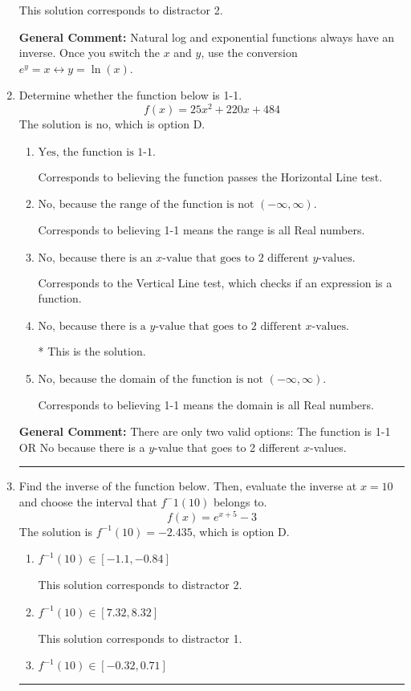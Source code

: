 \documentclass{extbook}[14pt]
\newcommand{\litem}[1]{\item #1

\rule{\textwidth}{0.4pt}}
\begin{document}
\begin{enumerate}
{\begin{enumerate}[label=\Alph*.]
 This solution corresponds to distractor 2.
\end{enumerate}

\textbf{General Comment:} Natural log and exponential functions always have an inverse. Once you switch the $x$ and $y$, use the conversion $ e^y = x \leftrightarrow y=\ln(x)$.
}
\litem{
Determine whether the function below is 1-1.
\[ f(x) = 25 x^2 + 220 x + 484 \]The solution is \( \text{no} \), which is option D.\begin{enumerate}[label=\Alph*.]
\item \( \text{Yes, the function is 1-1.} \)

Corresponds to believing the function passes the Horizontal Line test.
\item \( \text{No, because the range of the function is not $(-\infty, \infty)$.} \)

Corresponds to believing 1-1 means the range is all Real numbers.
\item \( \text{No, because there is an $x$-value that goes to 2 different $y$-values.} \)

Corresponds to the Vertical Line test, which checks if an expression is a function.
\item \( \text{No, because there is a $y$-value that goes to 2 different $x$-values.} \)

* This is the solution.
\item \( \text{No, because the domain of the function is not $(-\infty, \infty)$.} \)

Corresponds to believing 1-1 means the domain is all Real numbers.
\end{enumerate}

\textbf{General Comment:} There are only two valid options: The function is 1-1 OR No because there is a $y$-value that goes to 2 different $x$-values.
}
\litem{
Find the inverse of the function below. Then, evaluate the inverse at $x = 10$ and choose the interval that $f^-1(10)$ belongs to.
\[ f(x) = e^{x+5}-3 \]The solution is \( f^{-1}(10) = -2.435 \), which is option D.\begin{enumerate}[label=\Alph*.]
\item \( f^{-1}(10) \in [-1.1, -0.84] \)

 This solution corresponds to distractor 2.
\item \( f^{-1}(10) \in [7.32, 8.32] \)

 This solution corresponds to distractor 1.
\item \( f^{-1}(10) \in [-0.32, 0.71] \)


\end{enumerate}}
\end{enumerate}
\end{document}
